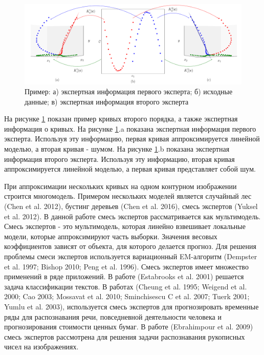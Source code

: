 \begin{figure}[h!]
\center
     \includegraphics[width=\textwidth]{results/priorexpertfig/explanation}
     \caption{Пример: а) экспертная информация первого эксперта; б) исходные данные; в) экспертная информация второго эксперта}
    \label{intro:fig2}
\end{figure}
На рисунке \ref{intro:fig2} показан пример кривых второго порядка, а также экспертная информация о кривых. На рисунке \ref{intro:fig2}.a показана экспертная информация первого эксперта. Используя эту информацию, первая кривая аппроксимируется линейной моделью, а вторая кривая - шумом. На рисунке \ref{intro:fig2}.b показана экспертная информация второго эксперта. Используя эту информацию, вторая кривая аппроксимируется линейной моделью, а первая кривая представляет собой шум.

При аппроксимации нескольких кривых на одном контурном изображении строится многомодель. Примером нескольких моделей является случайный лес (Chen et al. 2012), бустинг деревьев (Chen et al. 2016), смесь экспертов (Yuksel et al. 2012). В данной работе смесь экспертов рассматривается как мультимодель. Смесь экспертов - это мультимодель, которая линейно взвешивает локальные модели, которые аппроксимируют часть выборки. Значения весовых коэффициентов зависят от объекта, для которого делается прогноз. Для решения проблемы смеси  экспертов используется вариационный EM-алгоритм (Dempster et al. 1997; Bishop 2010; Peng et al. 1996). Смесь экспертов имеет множество применений в ряде приложений. В работе  (Estabrooks et al. 2001) решается задача классификации текстов. В работах (Cheung et al. 1995; Weigend et al. 2000; Cao 2003; Mossavat et al. 2010; Sminchisescu C et al. 2007; Tuerk 2001; Yumlu et al. 2003), используется смесь экспертов для прогнозировать временные ряды для распознавания речи, повседневной деятельности человека и прогнозирования стоимости ценных бумаг. В работе (Ebrahimpour et al. 2009) смесь экспертов рассмотрена для решения задачи распознавания рукописных чисел на изображениях.

